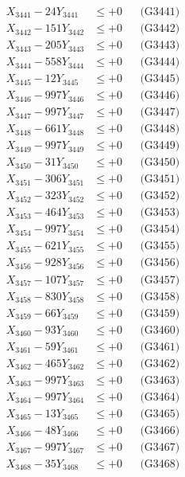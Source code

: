 \documentclass[a4paper,10pt]{article}
\begin{document}
{\begin{align}
\allowbreak
X_{3441} - 24Y_{3441} &\leq +0 && \text{(G3441)} \\
X_{3442} - 151Y_{3442} &\leq +0 && \text{(G3442)} \\
X_{3443} - 205Y_{3443} &\leq +0 && \text{(G3443)} \\
X_{3444} - 558Y_{3444} &\leq +0 && \text{(G3444)} \\
X_{3445} - 12Y_{3445} &\leq +0 && \text{(G3445)} \\
X_{3446} - 997Y_{3446} &\leq +0 && \text{(G3446)} \\
X_{3447} - 997Y_{3447} &\leq +0 && \text{(G3447)} \\
X_{3448} - 661Y_{3448} &\leq +0 && \text{(G3448)} \\
X_{3449} - 997Y_{3449} &\leq +0 && \text{(G3449)} \\
X_{3450} - 31Y_{3450} &\leq +0 && \text{(G3450)} \\
\allowbreak
X_{3451} - 306Y_{3451} &\leq +0 && \text{(G3451)} \\
X_{3452} - 323Y_{3452} &\leq +0 && \text{(G3452)} \\
X_{3453} - 464Y_{3453} &\leq +0 && \text{(G3453)} \\
X_{3454} - 997Y_{3454} &\leq +0 && \text{(G3454)} \\
X_{3455} - 621Y_{3455} &\leq +0 && \text{(G3455)} \\
X_{3456} - 928Y_{3456} &\leq +0 && \text{(G3456)} \\
X_{3457} - 107Y_{3457} &\leq +0 && \text{(G3457)} \\
X_{3458} - 830Y_{3458} &\leq +0 && \text{(G3458)} \\
X_{3459} - 66Y_{3459} &\leq +0 && \text{(G3459)} \\
X_{3460} - 93Y_{3460} &\leq +0 && \text{(G3460)} \\
\allowbreak
X_{3461} - 59Y_{3461} &\leq +0 && \text{(G3461)} \\
X_{3462} - 465Y_{3462} &\leq +0 && \text{(G3462)} \\
X_{3463} - 997Y_{3463} &\leq +0 && \text{(G3463)} \\
X_{3464} - 997Y_{3464} &\leq +0 && \text{(G3464)} \\
X_{3465} - 13Y_{3465} &\leq +0 && \text{(G3465)} \\
X_{3466} - 48Y_{3466} &\leq +0 && \text{(G3466)} \\
X_{3467} - 997Y_{3467} &\leq +0 && \text{(G3467)} \\
X_{3468} - 35Y_{3468} &\leq +0 && \text{(G3468)} \\

\end{align}}
\end{document}
